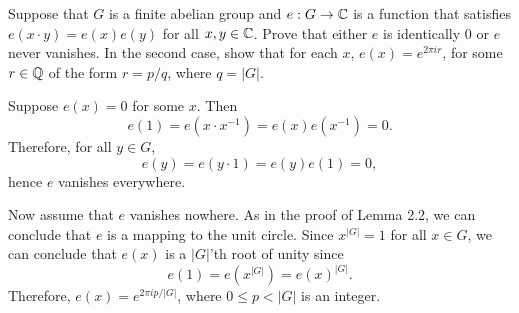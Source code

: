 \begin{exrc}[12]
    Suppose that \(G\) is a finite abelian group and \(e: G \to \mathbb{C}\)
    is a function that satisfies \(e(x \cdot y) = e(x) e(y)\) for all \(x, y \in \mathbb{C}\).
    Prove that either \(e\) is identically \(0\) or \(e\) never vanishes.
    In the second case, show that for each \(x\), \(e(x) = e^{2 \pi i r}\),
    for some \(r \in \mathbb{Q}\) of the form \(r = p / q\), where \(q = |G|\).

\begin{soln}
    Suppose \(e(x) = 0\) for some \(x\).
    Then
    \begin{equation*}
        e(1) = e(x \cdot x^{-1}) = e(x) e(x^{-1}) = 0.
    \end{equation*}
    Therefore, for all \(y \in G\),
    \begin{equation*}
        e(y) = e(y \cdot 1) = e(y) e(1) = 0,
    \end{equation*}
    hence \(e\) vanishes everywhere.

    Now assume that \(e\) vanishes nowhere.
    As in the proof of Lemma 2.2, we can conclude that \(e\) is a mapping to the unit circle.
    Since \(x^{|G|} = 1\) for all \(x \in G\),
    we can conclude that \(e(x)\) is a \(|G|\)'th root of unity since
    \begin{equation*}
        e(1) = e(x^{|G|}) = e(x)^{|G|}.
    \end{equation*}
    Therefore, \(e(x) = e^{2 \pi i p / |G|}\), where \(0 \leq p < |G|\) is an integer.


\end{soln}
\end{exrc}
